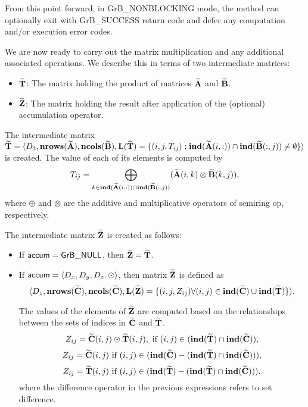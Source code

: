 From this point forward, in {\sf GrB\_NONBLOCKING} mode, the method can 
optionally exit with {\sf GrB\_SUCCESS} return code and defer any computation 
and/or execution error codes.

We are now ready to carry out the matrix multiplication and any additional 
associated operations.  We describe this in terms of two intermediate matrices:
\begin{itemize}
    \item ${\bf \widetilde{T}}$: The matrix holding the product of matrices 
    ${\bf \widetilde{A}}$ and ${\bf \widetilde{B}}$.
    \item ${\bf \widetilde{Z}}$: The matrix holding the result after 
    application of the (optional) accumulation operator.
\end{itemize}

The intermediate matrix ${\bf \widetilde{T}} = \langle
D_3, \bold{nrows}({\bf \widetilde{A}}),
\bold{ncols}({\bf \widetilde{B}}), \bold{L}({\bf \widetilde{T}}) =
\{(i,j,T_{ij}) : \bold{ind}({\bf \widetilde{A}}(i,:)) \cap
\bold{ind}({\bf \widetilde{B}}(:,j)) \neq \emptyset \} \rangle$
is created.  The value of each of its elements is computed by \[T_{ij}
= \bigoplus_{k \in \bold{ind}({\bf \widetilde{A}}(i,:)) \cap
\bold{ind}({\bf \widetilde{B}}(:,j))} ({\bf \widetilde{A}}(i,k)
\otimes {\bf \widetilde{B}}(k,j)),\] where $\oplus$ and $\otimes$
are the additive and multiplicative operators of semiring {\sf op},
respectively.

The intermediate matrix ${\bf \widetilde{Z}}$ is created as follows:
\begin{itemize}
    \item If ${\sf accum} = {\sf GrB\_NULL}$, then ${\bf \widetilde{Z}} = {\bf \widetilde{T}}$.

    \item If ${\sf accum} = \langle D_x, D_y, D_z, \odot \rangle$, then matrix ${\bf \widetilde{Z}}$ is defined as 
        \[ \langle D_z, \bold{nrows}({\bf \widetilde{C}}), \bold{ncols}({\bf \widetilde{C}}),
        \bold{L}({\bf \widetilde{Z}}) 
		= \{(i,j,Z_{ij})  \forall (i,j) \in \bold{ind}({\bf \widetilde{C}}) \cup 
        \bold{ind}({\bf \widetilde{T}}) \} \rangle. \]

        The values of the elements of ${\bf \widetilde{Z}}$ are computed based on the 
        relationships between the sets of indices in ${\bf \widetilde{C}}$ and 
        ${\bf \widetilde{T}}$.
\[
Z_{ij} = {\bf \widetilde{C}}(i,j) \odot {\bf \widetilde{T}}(i,j), \ \mbox{if}\  (i,j) \in  (\bold{ind}({\bf \widetilde{T}}) \cap \bold{ind}({\bf \widetilde{C}})),
\]
\[
Z_{ij} = \matrix{\widetilde{C}}(i,j) \ \mbox{if}\  (i,j) \in  (\bold{ind}(\matrix{\widetilde{C}}) - (\bold{ind}(\matrix{\widetilde{T}}) \cap \bold{ind}(\matrix{\widetilde{C}}))),
\]
\[
Z_{ij} = \matrix{\widetilde{T}}(i,j) \ \mbox{if}\  (i,j) \in  (\bold{ind}(\matrix{\widetilde{T}}) - (\bold{ind}(\matrix{\widetilde{T}}) \cap \bold{ind}(\matrix{\widetilde{C}}))).
\]
where the difference operator in the previous expressions refers to set difference.
\end{itemize}

